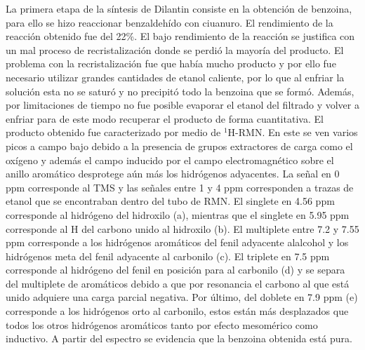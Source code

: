 \documentclass[fleqn,10pt]{SelfArx}
\begin{document}
La primera etapa de la síntesis de Dilantin consiste en la obtención de benzoina, para ello se hizo reaccionar benzaldehído con
ciuanuro. El rendimiento de la reacción obtenido fue del 22\%. El bajo rendimiento de la reacción se justifica con un mal proceso de
recristalización donde se perdió la mayoría del producto. El problema con la recristalización fue que había mucho producto y por ello fue necesario utilizar grandes cantidades de etanol caliente, por lo que al enfriar la solución esta no se saturó y no precipitó todo la benzoina que se formó. Además, por limitaciones de tiempo no fue posible evaporar el etanol del filtrado y volver a enfriar para de este modo recuperar el producto de forma cuantitativa. El producto obtenido fue caracterizado por medio de $^1$H-RMN. En este se ven varios picos a campo bajo debido a la presencia de grupos extractores de carga como el oxígeno y además el campo inducido por el campo electromagnético sobre el anillo aromático desprotege aún más los hidrógenos adyacentes. La señal en 0 ppm corresponde al
TMS y las señales entre 1 y 4 ppm corresponden a trazas de etanol que se encontraban dentro del tubo de RMN. El singlete en 4.56 ppm corresponde al hidrógeno del hidroxilo (a), mientras que el singlete en 5.95 ppm corresponde al H del carbono unido al hidroxilo (b). El multiplete entre 7.2 y 7.55 ppm corresponde a los
hidrógenos aromáticos del fenil adyacente alalcohol y los hidrógenos meta del fenil adyacente al carbonilo (c). El triplete en 7.5 ppm corresponde al hidrógeno del fenil en posición para al carbonilo (d) y se separa del multiplete de aromáticos debido a que por resonancia el carbono al que está unido adquiere una carga parcial negativa. Por último, del doblete en 7.9 ppm (e) corresponde a los hidrógenos orto al carbonilo, estos están más desplazados que todos los otros hidrógenos aromáticos tanto por efecto mesomérico como inductivo. A partir del espectro se evidencia que la benzoina obtenida está pura.
\end{document}
